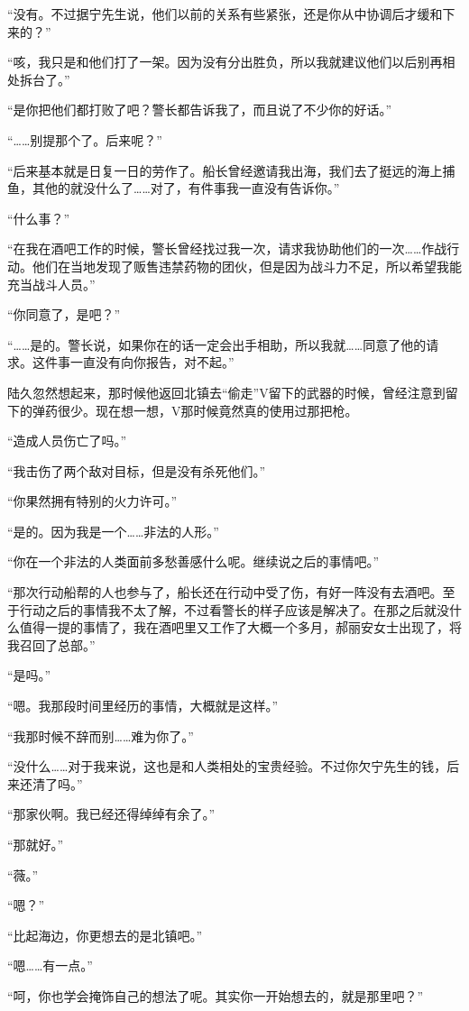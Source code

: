 “没有。不过据宁先生说，他们以前的关系有些紧张，还是你从中协调后才缓和下来的？”

“咳，我只是和他们打了一架。因为没有分出胜负，所以我就建议他们以后别再相处拆台了。”

“是你把他们都打败了吧？警长都告诉我了，而且说了不少你的好话。”

“……别提那个了。后来呢？”

“后来基本就是日复一日的劳作了。船长曾经邀请我出海，我们去了挺远的海上捕鱼，其他的就没什么了……对了，有件事我一直没有告诉你。”

“什么事？”

“在我在酒吧工作的时候，警长曾经找过我一次，请求我协助他们的一次……作战行动。他们在当地发现了贩售违禁药物的团伙，但是因为战斗力不足，所以希望我能充当战斗人员。”

“你同意了，是吧？”

“……是的。警长说，如果你在的话一定会出手相助，所以我就……同意了他的请求。这件事一直没有向你报告，对不起。”

陆久忽然想起来，那时候他返回北镇去“偷走”V留下的武器的时候，曾经注意到留下的弹药很少。现在想一想，V那时候竟然真的使用过那把枪。

“造成人员伤亡了吗。”

“我击伤了两个敌对目标，但是没有杀死他们。”

“你果然拥有特别的火力许可。”

“是的。因为我是一个……非法的人形。”

“你在一个非法的人类面前多愁善感什么呢。继续说之后的事情吧。”

“那次行动船帮的人也参与了，船长还在行动中受了伤，有好一阵没有去酒吧。至于行动之后的事情我不太了解，不过看警长的样子应该是解决了。在那之后就没什么值得一提的事情了，我在酒吧里又工作了大概一个多月，郝丽安女士出现了，将我召回了总部。”

“是吗。”

“嗯。我那段时间里经历的事情，大概就是这样。”

“我那时候不辞而别……难为你了。”

“没什么……对于我来说，这也是和人类相处的宝贵经验。不过你欠宁先生的钱，后来还清了吗。”

“那家伙啊。我已经还得绰绰有余了。”

“那就好。”

“薇。”

“嗯？”

“比起海边，你更想去的是北镇吧。”

“嗯……有一点。”

“呵，你也学会掩饰自己的想法了呢。其实你一开始想去的，就是那里吧？”

